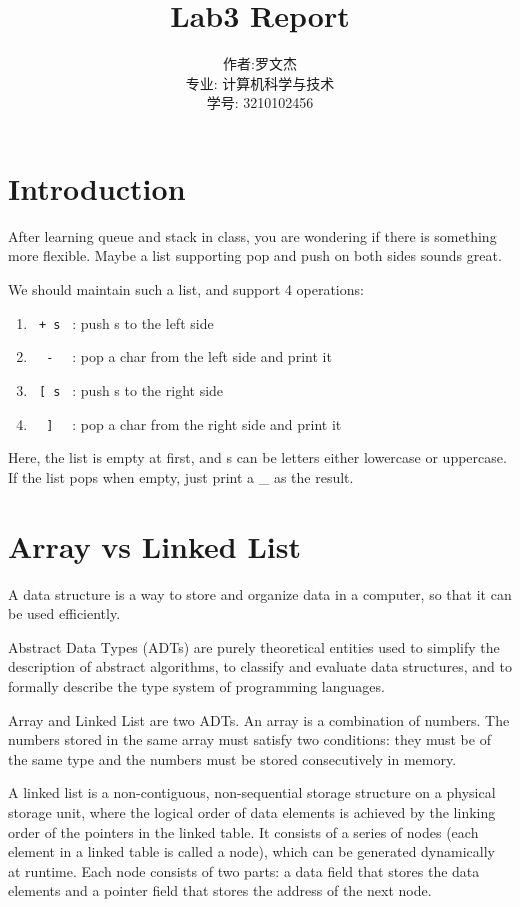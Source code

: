\documentclass[20pt]{ctexart}
\title{Lab3 Report}
\author{作者:罗文杰\\专业: 计算机科学与技术\\学号: 3210102456}
\date{}
\begin{document}
\maketitle

\section{Introduction}
After learning queue and stack in class, you are wondering if there is something more flexible. Maybe a list supporting pop and push on both sides sounds great.

We should maintain such a list, and support 4 operations:

\begin{enumerate}[itemindent=2em]
        \setlength{\itemsep}{-5pt}
        \item \verb| + s | : push s to the left side
        \item \verb|  -  | : pop a char from the left side and print it
        \item \verb| [ s | : push s to the right side
        \item \verb|  ]  | : pop a char from the right side and print it
      \end{enumerate}

Here, the list is empty at first, and s can be letters either lowercase or uppercase. If the list pops when empty, just print a \_ as the result.

\section{Array vs Linked List}
A data structure is a way to store and organize data in a computer, so that it can be used efficiently. 

Abstract Data Types (ADTs) are purely theoretical entities used to simplify the description of abstract algorithms, to classify and evaluate data structures, and to formally describe the type system of programming languages.

Array and Linked List are two ADTs. An array is a combination of numbers. The numbers stored in the same array must satisfy two conditions: they must be of the same type and the numbers must be stored consecutively in memory. 

A linked list is a non-contiguous, non-sequential storage structure on a physical storage unit, 
where the logical order of data elements is achieved by the linking order of the pointers in the linked table. 
It consists of a series of nodes (each element in a linked table is called a node), 
which can be generated dynamically at runtime. Each node consists of two parts: a data field that stores the data elements and a pointer field that stores the address of the next node. 
\end{document}
